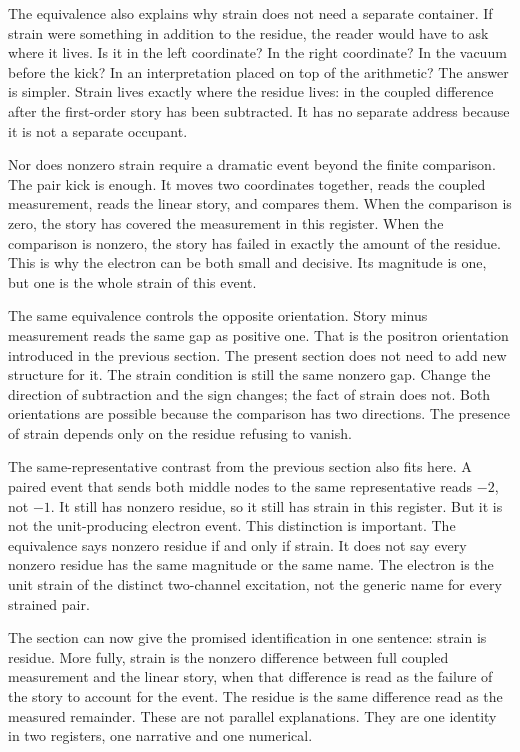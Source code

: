 The equivalence also explains why strain does not need a separate container. If
strain were something in addition to the residue, the reader would have to ask
where it lives. Is it in the left coordinate? In the right coordinate? In the
vacuum before the kick? In an interpretation placed on top of the arithmetic?
The answer is simpler. Strain lives exactly where the residue lives: in the
coupled difference after the first-order story has been subtracted. It has no
separate address because it is not a separate occupant.

Nor does nonzero strain require a dramatic event beyond the finite comparison.
The pair kick is enough. It moves two coordinates together, reads the coupled
measurement, reads the linear story, and compares them. When the comparison is
zero, the story has covered the measurement in this register. When the
comparison is nonzero, the story has failed in exactly the amount of the
residue. This is why the electron can be both small and decisive. Its magnitude
is one, but one is the whole strain of this event.

The same equivalence controls the opposite orientation. Story minus measurement
reads the same gap as positive one. That is the positron orientation introduced
in the previous section. The present section does not need to add new
structure for it. The strain condition is still the same nonzero gap. Change
the direction of subtraction and the sign changes; the fact of strain does not.
Both orientations are possible because the comparison has two directions. The
presence of strain depends only on the residue refusing to vanish.

The same-representative contrast from the previous section also fits here. A
paired event that sends both middle nodes to the same representative reads
\(-2\), not \(-1\). It still has nonzero residue, so it still has strain in this
register. But it is not the unit-producing electron event. This distinction is
important. The equivalence says nonzero residue if and only if strain. It does
not say every nonzero residue has the same magnitude or the same name. The
electron is the unit strain of the distinct two-channel excitation, not the
generic name for every strained pair.

The section can now give the promised identification in one sentence: strain is
residue. More fully, strain is the nonzero difference between full coupled
measurement and the linear story, when that difference is read as the failure
of the story to account for the event. The residue is the same difference read
as the measured remainder. These are not parallel explanations. They are one
identity in two registers, one narrative and one numerical.

